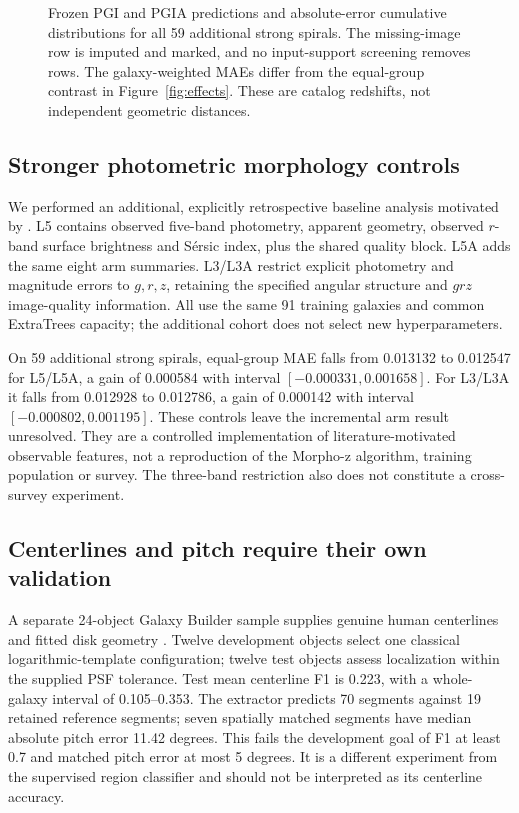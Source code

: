 \documentclass[11pt]{article}
\begin{document}
\begin{figure}[htbp]
\centering{}
\caption{Frozen PGI and PGIA predictions and absolute-error cumulative
distributions for all 59 additional strong spirals. The missing-image row is
imputed and marked, and no input-support screening removes rows. The
galaxy-weighted MAEs differ from the equal-group contrast in
Figure~\ref{fig:effects}. These are catalog redshifts, not independent geometric
distances.}
\label{fig:predictions}
\end{figure}

\FloatBarrier
\subsection{Stronger photometric morphology controls}
We performed an additional, explicitly retrospective baseline analysis
motivated by \citet{soo2018}. L5 contains observed five-band photometry,
apparent geometry, observed $r$-band surface brightness and S\'ersic index,
plus the shared quality block. L5A adds the same eight arm summaries. L3/L3A
restrict explicit photometry and magnitude errors to $g,r,z$, retaining the
specified angular structure and $grz$ image-quality information. All use the
same 91 training galaxies and common ExtraTrees capacity; the additional
cohort does not select new hyperparameters.

On 59 additional strong spirals, equal-group MAE falls from 0.013132 to
0.012547 for L5/L5A, a gain of 0.000584 with interval
$[-0.000331,0.001658]$. For L3/L3A it falls from 0.012928 to 0.012786,
a gain of 0.000142 with interval $[-0.000802,0.001195]$. These controls leave
the incremental arm result unresolved. They are a controlled implementation
of literature-motivated observable features, not a reproduction of the
Morpho-z algorithm, training population or survey. The three-band restriction
also does not constitute a cross-survey experiment.

\subsection{Centerlines and pitch require their own validation}
A separate 24-object Galaxy Builder sample supplies genuine human centerlines
and fitted disk geometry \citep{lingard2020,lingard2021}. Twelve development
objects select one classical logarithmic-template configuration; twelve test
objects assess localization within the supplied PSF tolerance. Test mean
centerline F1 is 0.223, with a whole-galaxy interval of 0.105--0.353. The
extractor predicts 70 segments against 19 retained reference segments; seven
spatially matched segments have median absolute pitch error 11.42 degrees.
This fails the development goal of F1 at least 0.7 and matched pitch error
at most 5 degrees. It is a different experiment from the supervised region
classifier and should not be interpreted as its centerline accuracy.
\end{document}
